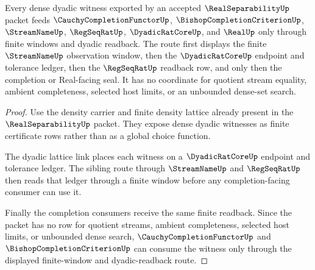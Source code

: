 \begin{theorem}
\label{thm:real-separability-cauchy-completion-route}
Every dense dyadic witness exported by an accepted $\RealSeparabilityUp$ packet feeds $\CauchyCompletionFunctorUp$, $\BishopCompletionCriterionUp$, $\StreamNameUp$, $\RegSeqRatUp$, $\DyadicRatCoreUp$, and $\RealUp$ only through finite windows and dyadic readback. The route first displays the finite $\StreamNameUp$ observation window, then the $\DyadicRatCoreUp$ endpoint and tolerance ledger, then the $\RegSeqRatUp$ readback row, and only then the completion or Real-facing seal. It has no coordinate for quotient stream equality, ambient completeness, selected host limits, or an unbounded dense-set search.
\end{theorem}
\begin{proof}
Use the density carrier and finite density lattice already present in the $\RealSeparabilityUp$ packet. They expose dense dyadic witnesses as finite certificate rows rather than as a global choice function.

The dyadic lattice link places each witness on a $\DyadicRatCoreUp$ endpoint and tolerance ledger. The sibling route through $\StreamNameUp$ and $\RegSeqRatUp$ then reads that ledger through a finite window before any completion-facing consumer can use it.

Finally the completion consumers receive the same finite readback. Since the packet has no row for quotient streams, ambient completeness, selected host limits, or unbounded dense search, $\CauchyCompletionFunctorUp$ and $\BishopCompletionCriterionUp$ can consume the witness only through the displayed finite-window and dyadic-readback route.
\end{proof}
